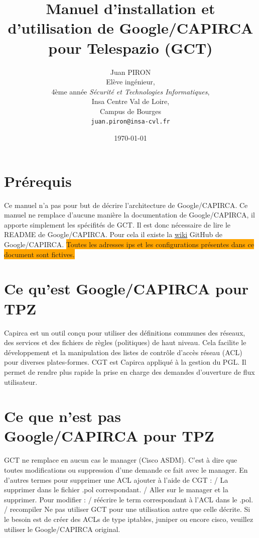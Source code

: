 \documentclass{article}
\title{Manuel d'installation et d'utilisation de Google/CAPIRCA pour Telespazio (GCT)}
\author{Juan PIRON\\
   Elève ingénieur,\\
   4ème année \textit{Sécurité et Technologies Informatiques},\\
   {\color{red} Insa Centre Val de Loire},\\
   {\color{green} Campus de Bourges}\\
   \texttt{juan.piron@insa-cvl.fr}
}
\date{\today}
\begin{document}
  \maketitle

  \newpage
  \tableofcontents
  \newpage

  \section{Prérequis}

    \justify
    Ce manuel n'a pas pour but de décrire l'architecture de Google/CAPIRCA.
    Ce manuel ne remplace d'aucune manière la documentation de Google/CAPIRCA, il apporte simplement les spécifités de GCT.
    Il est donc nécessaire de lire le README de Google/CAPIRCA.
    Pour cela il existe la \href{https://github.com/google/capirca/wiki}{wiki} GitHub de Google/\-CAPIRCA.
    \bigbreak
    \centering
    \colorbox{orange}{Toutes les adresses ips et les configurations présentes dans ce document sont fictives.}
    \justify

  \section{Ce qu'est Google/CAPIRCA pour TPZ}

    \noindent Capirca est un outil conçu pour utiliser des définitions communes des réseaux, des services et des fichiers de règles (politiques) de haut niveau.
    Cela facilite le développement et la manipulation des listes de contrôle d'accès réseau (ACL) pour diverses plates-formes.
    CGT est Capirca appliqué à la gestion du PGL. Il permet de rendre plus rapide la prise en charge des demandes d'ouverture de flux utilisateur.
    \smallbreak

  \section{Ce que n'est pas Google/CAPIRCA pour TPZ}

    \noindent GCT ne remplace en aucun cas le manager (Cisco ASDM). C'est à dire que toutes modifications ou suppression d'une demande ce fait avec le manager.
    En d'autres termes pour supprimer une ACL ajouter à l'aide de CGT : / La supprimer dans le fichier .pol correspondant. / Aller sur le manager et la supprimer. \bigbreak
    \noindent Pour modifier : / réécrire le term correspondant à l'ACL dans le .pol. / recompiler \smallbreak
    \noindent Ne pas utiliser GCT pour une utilisation autre que celle décrite. Si le besoin est de créer des ACLs de type iptables,
    juniper ou encore cisco, veuillez utiliser le Google/CAPIRCA original.
\end{document}
